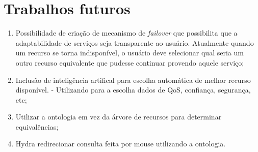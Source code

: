 \section{Trabalhos futuros}


\begin{enumerate}
	\item Possibilidade de criação de mecanismo de \emph{failover} que possibilita que a adaptabilidade de serviços seja transparente ao usuário. Atualmente quando um recurso se torna indisponível, o usuário deve selecionar qual seria um outro recurso equivalente que pudesse continuar provendo aquele serviço;
	\item Inclusão de inteligência artifical para escolha automática de melhor recurso disponível.
		- Utilizando para a escolha dados de QoS, confiança, segurança, etc;
	\item Utilizar a ontologia em vez da árvore de recursos para determinar equivalências;
	\item Hydra redirecionar consulta feita por mouse utilizando a ontologia.
\end{enumerate}